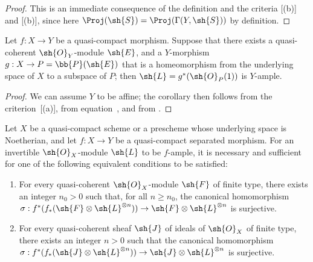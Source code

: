 \begin{proof}
This is an immediate consequence of the definition  and the criteria [(b)] and [(b)], since here $\Proj(\sh{S})=\Proj(\Gamma(Y,\sh{S}))$ by definition.
\end{proof}

\begin{corollary}[4.6.7]
\label{II.4.6.7}
Let $f: X\to Y$ be a quasi-compact morphism.
Suppose that there exists a quasi-coherent $\sh{O}_Y$-module $\sh{E}$, and a $Y$-morphism $g:X\to P=\bb{P}(\sh{E})$ that is a homeomorphism from the underlying space of $X$ to a subspace of $P$;
then $\sh{L}=g^*(\sh{O}_P(1))$ is $Y$-ample.
\end{corollary}

\begin{proof}
We can assume $Y$ to be affine;
the corollary then follows from the criterion~[(a)], from equation~, and from .
\end{proof}

\begin{proposition}[4.6.8]
\label{II.4.6.8}
Let $X$ be a quasi-compact scheme or a prescheme whose underlying space is Noetherian, and let $f:X\to Y$ be a quasi-compact separated morphism.
For an invertible $\sh{O}_X$-module $\sh{L}$ to be $f$-ample, it is necessary and sufficient for one of the following equivalent conditions to be satisfied:
\begin{enumerate}
  \item[\rm{(c)}] For every quasi-coherent $\sh{O}_X$-module $\sh{F}$ of finite type, there exists an integer $n_0>0$ such that, for all $n\geq n_0$, the canonical homomorphism $\sigma:f^*(f_*(\sh{F}\otimes\sh{L}^{\otimes n}))\to\sh{F}\otimes\sh{L}^{\otimes n}$ is surjective.
  \item[\rm{(c')}] For every quasi-coherent sheaf $\sh{J}$ of ideals of $\sh{O}_X$ of finite type, there exists an integer $n>0$ such that the canonical homomorphism $\sigma:f^*(f_*(\sh{J}\otimes\sh{L}^{\otimes n}))\to\sh{J}\otimes\sh{L}^{\otimes n}$ is surjective.
\end{enumerate}
\end{proposition}

